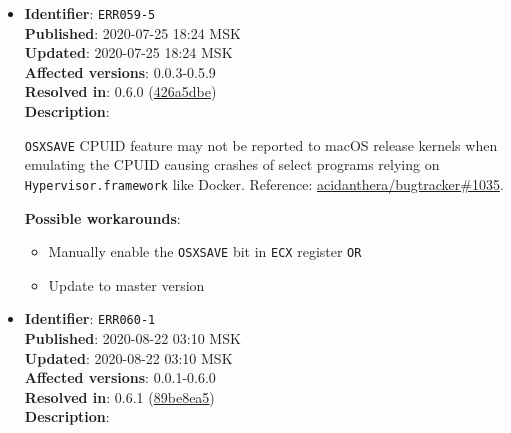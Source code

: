 \documentclass[]{article}
\providecommand{\tightlist}{%
  \setlength{\itemsep}{0pt}\setlength{\parskip}{0pt}}
\begin{document}
\begin{itemize}
  \textbf{Possible workarounds}:
  \begin{itemize}
    \tightlist
    \item For \textbf{preview} version of KernelCollection injection code please update
    to commit \texttt{d8ace476} and make sure that variables forcing legacy
    kernel loading (\texttt{booter-fileset-kernel} and \texttt{booter-fileset-basesystem})
    are deleted from NVRAM.
    \item For \textbf{preinstalled} versions of macOS 11 add NVRAM variable \\
    \texttt{7C436110-AB2A-4BBB-A880-FE41995C9F82:booter-fileset-kernel}
    with \texttt{00} value; for some EfiBoot variants it may also be
    required to set \texttt{booter-fileset-basesystem} variable with \texttt{00} value.
  \end{itemize}


\item
  \textbf{Identifier}: \texttt{ERR059-5} \\
  \textbf{Published}: 2020-07-25 18:24 MSK \\
  \textbf{Updated}: 2020-07-25 18:24 MSK \\
  \textbf{Affected versions}: 0.0.3-0.5.9 \\
  \textbf{Resolved in}: 0.6.0 (\href{https://github.com/acidanthera/MaxRegnerPkg/commit/426a5dbe09365d3fe1d18dbde9868fe12900c30c}{426a5dbe}) \\
  \textbf{Description}:

  \texttt{OSXSAVE} CPUID feature may not be reported to macOS release kernels when emulating the CPUID
  causing crashes of select programs relying on \texttt{Hypervisor.framework} like Docker. Reference:
  \href{https://github.com/acidanthera/bugtracker/issues/1035}{acidanthera/bugtracker\#1035}.

  \textbf{Possible workarounds}:
  \begin{itemize}
    \tightlist
    \item Manually enable the \texttt{OSXSAVE} bit in \texttt{ECX} register \texttt{OR}
    \item Update to master version
  \end{itemize}

\item
  \textbf{Identifier}: \texttt{ERR060-1} \\
  \textbf{Published}: 2020-08-22 03:10 MSK \\
  \textbf{Updated}: 2020-08-22 03:10 MSK \\
  \textbf{Affected versions}: 0.0.1-0.6.0 \\
  \textbf{Resolved in}: 0.6.1 (\href{https://github.com/acidanthera/MaxRegnerPkg/commit/89be8ea5bb98dc8c9eb49a5e29c5343643535ae4}{89be8ea5}) \\
  \textbf{Description}:


\end{itemize}
\end{document}
